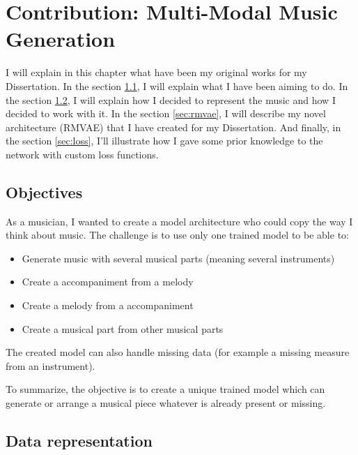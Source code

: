 \documentclass[12pt]{report}
\begin{document}
\newpage
\chapter{Contribution: Multi-Modal Music Generation}
\label{chap:contribution}

I will explain in this chapter what have been my original works for my Dissertation.
In the section \ref{sec:objectives}, I will explain what I have been aiming to do.
In the section \ref{sec:data_represetation}, I will explain how I decided to represent the music and how I decided to work with it.
In the section \ref{sec:rmvae}, I will describe my novel architecture (RMVAE) that I have created for my Dissertation.
And finally, in the section \ref{sec:loss}, I'll illustrate how I gave some prior knowledge to the network with custom loss functions.


\section{Objectives}
\label{sec:objectives}

As a musician, I wanted to create a model architecture who could copy the way I think about music.
The challenge is to use only one trained model to be able to:
\begin{itemize}
    \item Generate music with several musical parts (meaning several instruments)
    \item Create a accompaniment from a melody
    \item Create a melody from a accompaniment
    \item Create a musical part from other musical parts
\end{itemize}
The created model can also handle missing data (for example a missing measure from an instrument).

To summarize, the objective is to create a unique trained model which can generate or arrange a musical piece whatever is already present or missing.

\section{Data representation}
\label{sec:data_represetation}
\end{document}
